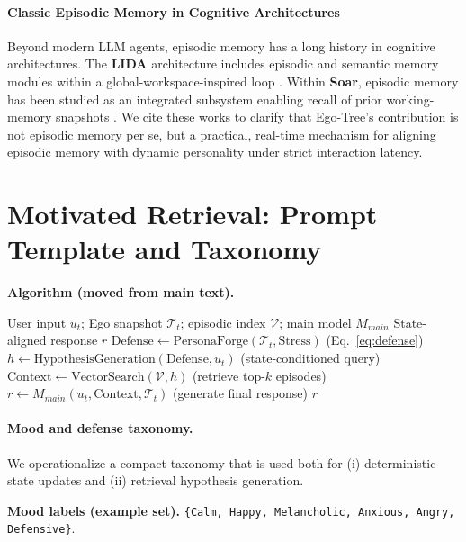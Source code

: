 \documentclass{article}
\begin{document}
\paragraph{Classic Episodic Memory in Cognitive Architectures}
Beyond modern LLM agents, episodic memory has a long history in cognitive architectures. The \textbf{LIDA} architecture includes episodic and semantic memory modules within a global-workspace-inspired loop \cite{ramamurthy2006lida}. Within \textbf{Soar}, episodic memory has been studied as an integrated subsystem enabling recall of prior working-memory snapshots \cite{nuxoll2012episodic}. We cite these works to clarify that Ego-Tree's contribution is not episodic memory per se, but a practical, real-time mechanism for aligning episodic memory with dynamic personality under strict interaction latency.



\section{Motivated Retrieval: Prompt Template and Taxonomy}
\label{app:motivated-retrieval}

\noindent\textbf{Algorithm (moved from main text).}
\begin{algorithm}[t]
\caption{State-Dependent Query Expansion (System~2)}
\label{alg:motivated-retrieval}
\begin{algorithmic}[1]
\REQUIRE User input $u_t$; Ego snapshot $\mathcal{T}_t$; episodic index $\mathcal{V}$; main model $M_{main}$
\ENSURE State-aligned response $r$
\STATE $\text{Defense} \leftarrow \text{PersonaForge}(\mathcal{T}_t, \text{Stress})$ \hfill (Eq.~\ref{eq:defense})
\STATE $h \leftarrow \text{HypothesisGeneration}(\text{Defense}, u_t)$ \hfill (state-conditioned query)
\STATE $\text{Context} \leftarrow \text{VectorSearch}(\mathcal{V}, h)$ \hfill (retrieve top-$k$ episodes)
\STATE $r \leftarrow M_{main}(u_t, \text{Context}, \mathcal{T}_t)$ \hfill (generate final response)
\RETURN $r$
\end{algorithmic}
\end{algorithm}

\paragraph{Mood and defense taxonomy.}
We operationalize a compact taxonomy that is used both for (i) deterministic state updates and (ii) retrieval hypothesis generation.

\textbf{Mood labels (example set).}
\texttt{\{Calm, Happy, Melancholic, Anxious, Angry, Defensive\}}.
\end{document}
